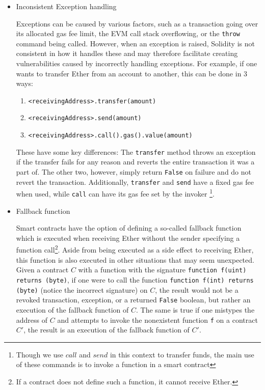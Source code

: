 \documentclass[letterpaper,twocolumn,10pt]{article}
\begin{document}
\begin{itemize}
  \item Inconsistent Exception handling
	
	Exceptions can be caused by various factors, such as a transaction going over its allocated gas fee limit, the EVM call stack overflowing, or the \verb|throw| command being called. However, when an exception is raised, Solidity is not consistent in how it handles these and may therefore facilitate creating vulnerabilities caused by incorrectly handling exceptions. For example, if one wants to transfer Ether from an account to another, this can be done in 3 ways: 
	\begin{enumerate}
	\item \verb|<receivingAddress>.transfer(amount)| 
	\item \verb|<receivingAddress>.send(amount)|
	\item \verb|<receivingAddress>.call().gas().value(amount)|
	\end{enumerate}
	
	These have some key differences: The \verb|transfer| method throws an exception if the transfer fails for any reason and reverts the entire transaction it was a part of. The other two, however, simply return \verb|False| on failure and do not revert the transaction. Additionally, \verb|transfer| and \verb|send| have a fixed gas fee when used, while \verb|call| can have its gas fee set by the invoker \footnote{Though we use $call$ and $send$ in this context to transfer funds, the main use of these commands is to invoke a function in a smart contract}. 
  \item Fallback function
  
  Smart contracts have the option of defining a so-called fallback function which is executed when receiving Ether without the sender specifying a function call\footnote{If a contract does not define such a function, it cannot receive Ether.}. Aside from being executed as a side effect to receiving Ether, this function is also executed in other situations that may seem unexpected. Given a contract $C$ with a function with the signature \verb|function f(uint) returns (byte)|, if one were to call the function \verb|function f(int) returns (byte)| (notice the incorrect signature) on $C$, the result would not be a revoked transaction, exception, or a returned \verb|False| boolean, but rather an execution of the fallback function of $C$. The same is true if one mistypes the address of $C$ and attempts to invoke the nonexistent function \verb|f| on a contract $C'$, the result is an execution of the fallback function of $C'$. 
  

\end{itemize}
\end{document}
